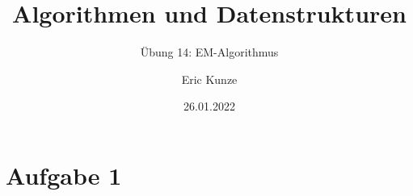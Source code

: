 \documentclass{beamer}
\DeclareMathOperator*{\argmax}{arg\,max}
\DeclareMathOperator{\mle}{mle}
\DeclareMathOperator{\rfe}{rfe}
\begin{document}
	
	\title{Algorithmen und Datenstrukturen}
	\subtitle{Übung 14: EM-Algorithmus}
	\author{Eric Kunze}
	\date{26.01.2022}

	\maketitle


\section{Aufgabe 1}

%	
%	
%	
\end{document}

